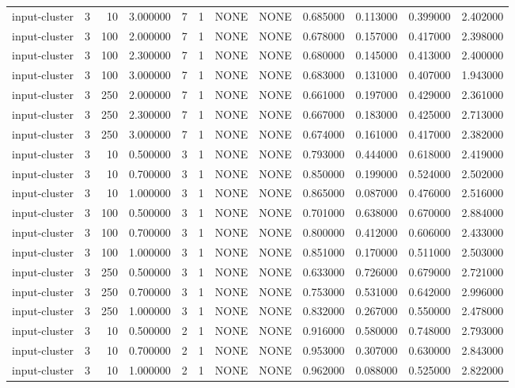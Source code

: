 \begin{tabular}{lrrrllllrrrr}
input-cluster & 3 & 10 & 3.000000 & 7 & 1 & NONE & NONE & 0.685000 & 0.113000 & 0.399000 & 2.402000 \\
input-cluster & 3 & 100 & 2.000000 & 7 & 1 & NONE & NONE & 0.678000 & 0.157000 & 0.417000 & 2.398000 \\
input-cluster & 3 & 100 & 2.300000 & 7 & 1 & NONE & NONE & 0.680000 & 0.145000 & 0.413000 & 2.400000 \\
input-cluster & 3 & 100 & 3.000000 & 7 & 1 & NONE & NONE & 0.683000 & 0.131000 & 0.407000 & 1.943000 \\
input-cluster & 3 & 250 & 2.000000 & 7 & 1 & NONE & NONE & 0.661000 & 0.197000 & 0.429000 & 2.361000 \\
input-cluster & 3 & 250 & 2.300000 & 7 & 1 & NONE & NONE & 0.667000 & 0.183000 & 0.425000 & 2.713000 \\
input-cluster & 3 & 250 & 3.000000 & 7 & 1 & NONE & NONE & 0.674000 & 0.161000 & 0.417000 & 2.382000 \\
input-cluster & 3 & 10 & 0.500000 & 3 & 1 & NONE & NONE & 0.793000 & 0.444000 & 0.618000 & 2.419000 \\
input-cluster & 3 & 10 & 0.700000 & 3 & 1 & NONE & NONE & 0.850000 & 0.199000 & 0.524000 & 2.502000 \\
input-cluster & 3 & 10 & 1.000000 & 3 & 1 & NONE & NONE & 0.865000 & 0.087000 & 0.476000 & 2.516000 \\
input-cluster & 3 & 100 & 0.500000 & 3 & 1 & NONE & NONE & 0.701000 & 0.638000 & 0.670000 & 2.884000 \\
input-cluster & 3 & 100 & 0.700000 & 3 & 1 & NONE & NONE & 0.800000 & 0.412000 & 0.606000 & 2.433000 \\
input-cluster & 3 & 100 & 1.000000 & 3 & 1 & NONE & NONE & 0.851000 & 0.170000 & 0.511000 & 2.503000 \\
input-cluster & 3 & 250 & 0.500000 & 3 & 1 & NONE & NONE & 0.633000 & 0.726000 & 0.679000 & 2.721000 \\
input-cluster & 3 & 250 & 0.700000 & 3 & 1 & NONE & NONE & 0.753000 & 0.531000 & 0.642000 & 2.996000 \\
input-cluster & 3 & 250 & 1.000000 & 3 & 1 & NONE & NONE & 0.832000 & 0.267000 & 0.550000 & 2.478000 \\
input-cluster & 3 & 10 & 0.500000 & 2 & 1 & NONE & NONE & 0.916000 & 0.580000 & 0.748000 & 2.793000 \\
input-cluster & 3 & 10 & 0.700000 & 2 & 1 & NONE & NONE & 0.953000 & 0.307000 & 0.630000 & 2.843000 \\
input-cluster & 3 & 10 & 1.000000 & 2 & 1 & NONE & NONE & 0.962000 & 0.088000 & 0.525000 & 2.822000 \\

\end{tabular}
